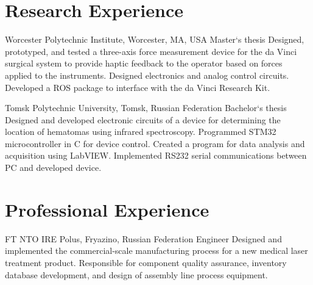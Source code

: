 \documentclass[10pt]{article} %
\begin{document}
\begin{paracol}{2}
\begin{supertabular}{rl}
\end{supertabular}

\section{Research Experience}

{} %
{Worcester Polytechnic Institute, Worcester, MA, USA} %
{Master`s thesis} %
{Designed, prototyped, and tested a three-axis force measurement device for the da Vinci surgical system to provide haptic feedback to the operator based on forces applied to the instruments. Designed electronics and analog control circuits. Developed a ROS package to interface with the da Vinci Research Kit.} %


{}
{Tomsk Polytechnic University, Tomsk, Russian Federation} %
{Bachelor`s thesis} %
{Designed and developed electronic circuits of
a device for determining the location of hematomas
using infrared spectroscopy. Programmed STM32 microcontroller
in C for device control. Created
a program for data analysis and acquisition using
LabVIEW. Implemented RS232 serial communications
between PC and developed device.}  %


\section{Professional Experience}


{FT} %
{NTO IRE Polus, Fryazino, Russian Federation} %
{Engineer} %
{Designed and implemented the commercial-scale manufacturing process for a new medical laser treatment product. Responsible for component quality assurance, inventory database development, and design of assembly line process equipment.} %



\end{paracol}
\end{document}
